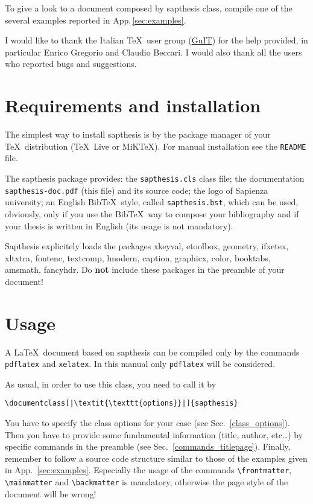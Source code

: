\documentclass[a5paper,11pt]{article}
\newcommand{\bs}{\textbackslash}
\begin{document}
To give a look to a document composed by \textsf{sapthesis} class, compile one of the several examples reported in App.\,\ref{sec:examples}.

I would like to thank the Italian \TeX\ user group (\href{http://www.guitex.org/}{GuIT}) for the help provided, in particular Enrico Gregorio and Claudio Beccari. I would also thank all the users who reported bugs and suggestions.

\section[Requirements\\ and installation]{Requirements and installation}
\label{requirements_installation}

The simplest way to install \textsf{sapthesis} is by the package manager of 
your \TeX\ distribution (\TeX\ Live or MiK\TeX). For manual installation see 
the \texttt{README} file. 

The \textsf{sapthesis} package provides: the 
\texttt{sapthesis.cls} class file; the documentation 
\texttt{sapthesis-doc.pdf} (this file) and its source code; the logo of 
Sapienza university; an English Bib\TeX\ style, called 
\texttt{sapthesis.bst}, which can be used, obviously, only if you use the 
Bib\TeX\ way to compose your bibliography and if your thesis is written in 
English (its usage is not mandatory).


\textsf{Sapthesis} explicitely loads the packages \textsf{xkeyval}, \textsf{etoolbox}, \textsf{geometry}, \textsf{ifxetex}, \textsf{xltxtra}, \textsf{fontenc}, \textsf{textcomp}, \textsf{lmodern}, \textsf{caption}, \textsf{graphicx}, \textsf{color}, \textsf{booktabs}, \textsf{amsmath}, \textsf{fancyhdr}.
Do \textbf{not} include these packages in the preamble of your document!





\section{Usage}

A \LaTeX\ document based on \textsf{sapthesis} can be compiled only by the commands
\texttt{pdflatex} and \texttt{xelatex}. In this manual only \texttt{pdflatex} will be considered.


As usual, in order to use this class, you need to call it by
\begin{lstlisting}
\documentclass[|\textit{\texttt{options}}|]{sapthesis}
\end{lstlisting}
You have to specify the class options for your case (see Sec.~\ref{class_options}). Then you have to provide some fundamental information (title, author, etc\ldots) by specific commands in the preamble (see Sec.~\ref{commands_titlepage}). Finally, remember to follow a source code structure similar to those of the examples given in App.~\ref{sec:examples}.
Especially the usage of the commands \texttt{\bs frontmatter}, \texttt{\bs mainmatter} and \texttt{\bs backmatter} is mandatory, otherwise the page style of the document will be wrong!
\end{document}
